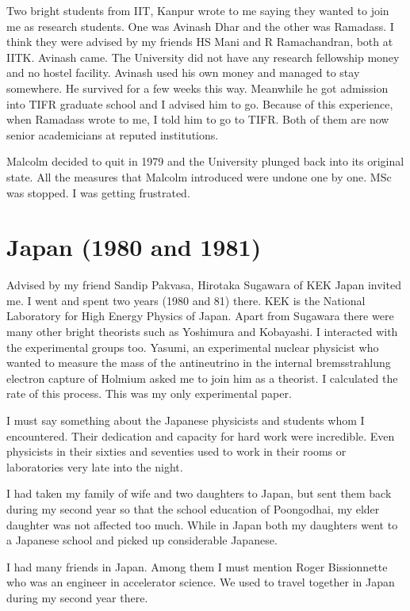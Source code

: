 Two bright students from IIT, Kanpur wrote to me saying they wanted to 
join me as research students. One was Avinash Dhar and the other was 
Ramadass. I think they were advised by my friends HS Mani and R 
Ramachandran, both at IITK. Avinash came. The University did not have 
any research fellowship mo\-ney and no hostel facility. Avinash used his 
own money and managed to stay somewhere. He survived for a few weeks 
this way. Meanwhile he got admission into TIFR graduate school and I 
advised him to go. Because of this experience, when Ramadass wrote to 
me, I told him to go to TIFR. Both of them are now senior academicians 
at reputed institutions.

Malcolm decided to quit in 1979 and the University plunged back into its 
original state. All the measures that Malcolm introduced were undone one 
by one. MSc was stopped. I was getting frustrated.
\vspace{-\topsep}
\section*{Japan (1980 and 1981)}

Advised by my friend Sandip Pakvasa, Hirotaka Sugawara of KEK Japan 
invited me. I went and spent two years (1980 and 81) there. KEK is the 
National Laboratory for High Energy Physics of Japan. Apart from 
Sugawara there were many other bright theorists such as Yoshimura and 
Kobayashi. I interacted with the experi\-mental groups too. Yasumi, an 
experimental nuclear physicist who wanted to measure the mass of the 
antineutrino in the internal bremsstrahlung electron capture of Holmium 
asked me to join him as a theorist. I calculated the rate of this 
process. This was my only experimental paper.


I must say something about the Japanese physicists and students whom I 
encountered. Their dedication and capacity for hard work were 
incredible. Even physicists in their sixties and seventies used to work 
in their rooms or laboratories very late into the night.


I had taken my family of wife and two daughters to Japan, but sent them 
back during my second year so that the school education of Poongodhai, my 
elder daughter was not affected too much. While in Japan both my 
daughters went to a Japanese school and picked up considerable Japanese.


I had many friends in Japan. Among them I must mention Roger 
Bissionnette who was an engineer in accelerator science. We used to 
travel together in Japan during my second year there.


